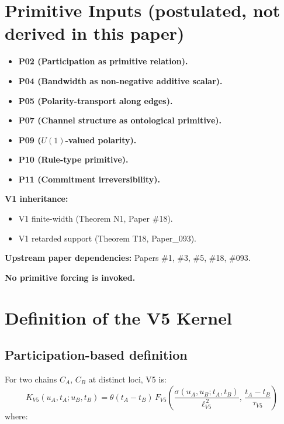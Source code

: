 \documentclass[11pt,a4paper]{article}
\begin{document}
\section{Primitive Inputs (postulated, not derived in this paper)}

\begin{itemize}[noitemsep]
\item \textbf{P02 (Participation as primitive relation).}
\item \textbf{P04 (Bandwidth as non-negative additive scalar).}
\item \textbf{P05 (Polarity-transport along edges).}
\item \textbf{P07 (Channel structure as ontological primitive).}
\item \textbf{P09 ($U(1)$-valued polarity).}
\item \textbf{P10 (Rule-type primitive).}
\item \textbf{P11 (Commitment irreversibility).}
\end{itemize}

\textbf{V1 inheritance:}

\begin{itemize}[noitemsep]
\item V1 finite-width (Theorem N1, Paper \#18).
\item V1 retarded support (Theorem T18, Paper\_093).
\end{itemize}

\textbf{Upstream paper dependencies:} Papers \#1, \#3, \#5, \#18, \#093.

\textbf{No primitive forcing is invoked.}

\section{Definition of the V5 Kernel}

\subsection{Participation-based definition}

For two chains $C_A$, $C_B$ at distinct loci, V5 is:
\[
K_{V5}(u_A, t_A; u_B, t_B) = \theta(t_A - t_B)\, F_{V5}\!\left(\frac{\sigma(u_A, u_B; t_A, t_B)}{\ell_{V5}^{\,2}},\, \frac{t_A - t_B}{\tau_{V5}}\right)
\]
where:
\end{document}
